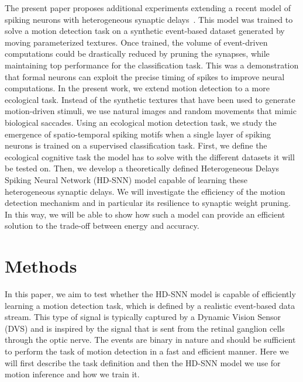 \documentclass[default]{sn-jnl}%
\theoremstyle{thmstyleone}%
\theoremstyle{thmstyletwo}%
\theoremstyle{thmstylethree}%
\begin{document}
The present paper proposes additional experiments extending a recent model of spiking neurons with heterogeneous synaptic delays~\cite{grimaldi_learning_2022}. This model was trained to solve a motion detection task on a synthetic event-based dataset generated by moving parameterized textures. Once trained, the volume of event-driven computations could be drastically reduced by pruning the synapses, while maintaining top performance for the classification task. This was a demonstration that formal neurons can exploit the precise timing of spikes to improve neural computations. In the present work, we extend motion detection to a more ecological task. Instead of the synthetic textures that have been used to generate motion-driven stimuli, we use natural images and random movements that mimic biological saccades. Using an ecological motion detection task, we study the emergence of spatio-temporal spiking motifs when a single layer of spiking neurons is trained on a supervised classification task. First, we define the ecological cognitive task the model has to solve with the different datasets it will be tested on. Then, we develop a theoretically defined Heterogeneous Delays Spiking Neural Network (HD-SNN) model capable of learning these heterogeneous synaptic delays. We will investigate the efficiency of the motion detection mechanism and in particular its resilience to synaptic weight pruning. In this way, we will be able to show how such a model can provide an efficient solution to the trade-off between energy and accuracy.
%
\section{Methods}
\label{sec:methods}
In this paper, we aim to test whether the HD-SNN model is capable of efficiently learning a motion detection task, which is defined by a realistic event-based data stream. This type of signal is typically captured by a Dynamic Vision Sensor (DVS) and is inspired by the signal that is sent from the retinal ganglion cells through the optic nerve. The events are binary in nature and should be sufficient to perform the task of motion detection in a fast and efficient manner. Here we will first describe the task definition and then the HD-SNN model we use for motion inference and how we train it. 
%
\end{document}
